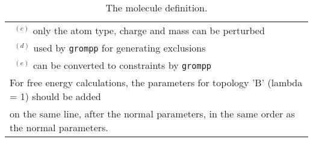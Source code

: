 \begin{table}[p]
{\begin{tabular}{|l|lllll|}
\multicolumn{6}{l}{~$^{(c)}$ only the atom type, charge and mass can be perturbed} \\
\multicolumn{6}{l}{~$^{(d)}$ used by {\tt grompp} for generating exclusions}\\
\multicolumn{6}{l}{~$^{(e)}$ can be converted to constraints by {\tt grompp}}\\
\multicolumn{6}{l}{For free energy calculations, the parameters for topology 'B' (lambda = 1) should be added}\\
\multicolumn{6}{l}{on the same line, after the normal parameters,
in the same order as the normal parameters.}
\end{tabular}
}
\caption{The molecule definition.}
\label{tab:topfile2}
\end{table}



